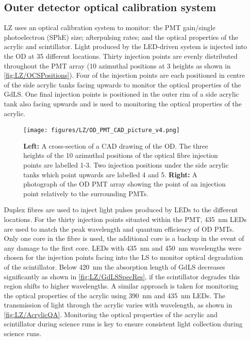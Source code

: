 \subsection{Outer detector optical calibration system}\label{sec:LZ/ODOCS}
LZ uses an optical calibration system to monitor: the PMT gain/single photoelectron (SPhE) size; afterpulsing rates; and the optical properties of the acrylic and scintillator. Light produced by the LED-driven system is injected into the OD at 35 different locations. Thirty injection points are evenly distributed throughout the PMT array  (10 azimuthal positions at 3 heights as shown in \autoref{fig:LZ/OCSPositions}). Four of the injection points are each positioned in centre of the side acrylic tanks facing upwards to monitor the optical properties of the GdLS. One final injection points is positioned in the outer rim of a side acrylic tank also facing upwards and is used to monitoring the optical properties of the acrylic.
\begin{figure}[!ht]
    \centering
    \texttt{[image: figures/LZ/OD\_PMT\_CAD\_picture\_v4.png]}
    \caption[A cross-section of a CAD drawing of the OD alongside a photograph of the OD PMT array.]{\textbf{Left:} A cross-section of a CAD drawing of the OD. The three  heights of the 10 azimuthal positions of the optical fibre injection points are labelled 1-3. Two injection positions under the side acrylic tanks which point upwards are labelled 4 and 5. \textbf{Right:} A photograph of the OD PMT array showing the point of an injection point relatively to the surrounding PMTs.}
    \label{fig:LZ/OCSPositions}
\end{figure}
Duplex fibres are used to inject light pulses produced by LEDs to the different locations. For the thirty injection points situated within the PMT, 435~nm LEDs are used to match the peak wavelength and quantum efficiency of OD PMTs. Only one core in the fibre is used, the additional core is a backup in the event of any damage to the first core. LEDs with 435~nm and 450~nm wavelengths were chosen for the injection points facing into the LS to monitor optical degradation of the scintillator. Below 420~nm the absorption length of GdLS decreases significantly as shown in \autoref{fig:LZ/GdLSSpecRes}, if the scintillator degrades this region shifts to higher wavelengths. A similar approach is taken for monitoring the optical properties of the acrylic using 390~nm and 435~nm LEDs. The transmission of light through the acrylic varies with wavelength, as shown in \autoref{fig:LZ/AcrylicQA}. Monitoring the optical properties of the acrylic and scintillator during science runs is key to ensure consistent light collection during science runs.
